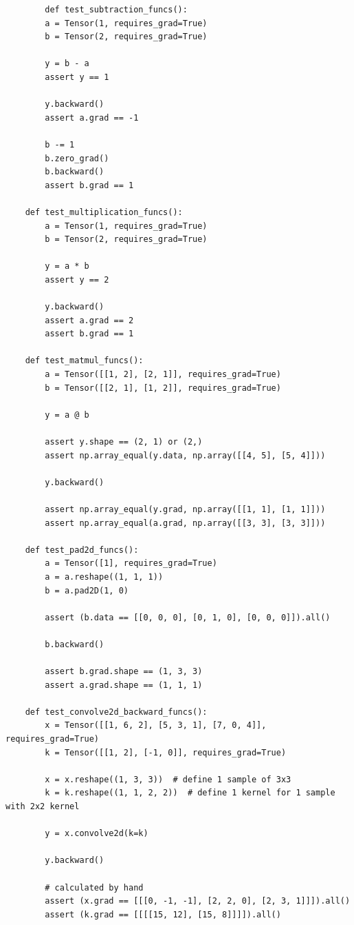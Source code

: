 \documentclass{article}
\begin{document}
    \begin{verbatim}
        def test_subtraction_funcs():
        a = Tensor(1, requires_grad=True)
        b = Tensor(2, requires_grad=True)

        y = b - a
        assert y == 1

        y.backward()
        assert a.grad == -1

        b -= 1
        b.zero_grad()
        b.backward()
        assert b.grad == 1

    def test_multiplication_funcs():
        a = Tensor(1, requires_grad=True)
        b = Tensor(2, requires_grad=True)

        y = a * b
        assert y == 2

        y.backward()
        assert a.grad == 2
        assert b.grad == 1

    def test_matmul_funcs():
        a = Tensor([[1, 2], [2, 1]], requires_grad=True)
        b = Tensor([[2, 1], [1, 2]], requires_grad=True)

        y = a @ b

        assert y.shape == (2, 1) or (2,)
        assert np.array_equal(y.data, np.array([[4, 5], [5, 4]]))

        y.backward()

        assert np.array_equal(y.grad, np.array([[1, 1], [1, 1]]))
        assert np.array_equal(a.grad, np.array([[3, 3], [3, 3]]))

    def test_pad2d_funcs():
        a = Tensor([1], requires_grad=True)
        a = a.reshape((1, 1, 1))
        b = a.pad2D(1, 0)

        assert (b.data == [[0, 0, 0], [0, 1, 0], [0, 0, 0]]).all()

        b.backward()

        assert b.grad.shape == (1, 3, 3)
        assert a.grad.shape == (1, 1, 1)

    def test_convolve2d_backward_funcs():
        x = Tensor([[1, 6, 2], [5, 3, 1], [7, 0, 4]], requires_grad=True)
        k = Tensor([[1, 2], [-1, 0]], requires_grad=True)

        x = x.reshape((1, 3, 3))  # define 1 sample of 3x3
        k = k.reshape((1, 1, 2, 2))  # define 1 kernel for 1 sample with 2x2 kernel

        y = x.convolve2d(k=k)

        y.backward()

        # calculated by hand
        assert (x.grad == [[[0, -1, -1], [2, 2, 0], [2, 3, 1]]]).all()
        assert (k.grad == [[[[15, 12], [15, 8]]]]).all()
    \end{verbatim}
\end{document}
